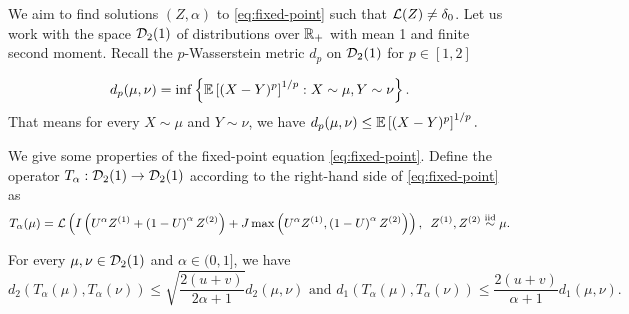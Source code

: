 We aim to find solutions $(Z,\alpha)$ to \ref{eq:fixed-point} such that $\mathcal{L}(Z) \neq \delta_0$. Let us work with the space $\mathcal{D}_2(1)$ of distributions over ${\mathbb{R}}_+$ with mean 1 and finite second moment. Recall the $p$-Wasserstein metric $d_p$ on $\mathcal{D}_2(1)$ for $p\in [1,2]$

$$d_p(\mu, \nu) = \inf\left\{\mathbb{E}\left[(X-Y)^p\right]^{1/p}: X\sim \mu, Y\sim \nu\right\}.$$
That means for every $X\sim \mu$ and $Y\sim \nu$, we have $d_p(\mu, \nu) \le \mathbb{E}\left[(X-Y)^p\right]^{1/p}.$

We give some properties of the fixed-point equation \ref{eq:fixed-point}. Define the operator $T_\alpha:\mathcal{D}_2(1)\to \mathcal{D}_2(1)$ according to the right-hand side of \ref{eq:fixed-point} as
\begin{equation}
  T_\alpha(\mu) = \mathcal{L}\left(I\left(U^\alpha Z^{(1)} + \left(1-U\right)^\alpha Z^{(2)}\right) + J\max\left(U^\alpha Z^{(1)}, \left(1-U\right)^\alpha Z^{(2)}\right)\right),\,\,\, Z^{(1)}, Z^{(2)} \stackrel{\text{iid}}{\sim} \mu.
\end{equation}

\begin{lemma}
  \label{lem:collapse-one-step}
  For every $\mu,\nu\in \mathcal{D}_2(1)$ and $\alpha\in(0,1]$, we have
  $$d_2(T_\alpha(\mu), T_\alpha(\nu)) \le \sqrt{\dfrac{2(u+v)}{2\alpha+1}}d_2(\mu, \nu) \text{ and } d_1(T_\alpha(\mu), T_\alpha(\nu)) \le \dfrac{2(u+v)}{\alpha+1}d_1(\mu, \nu).$$
\end{lemma}


